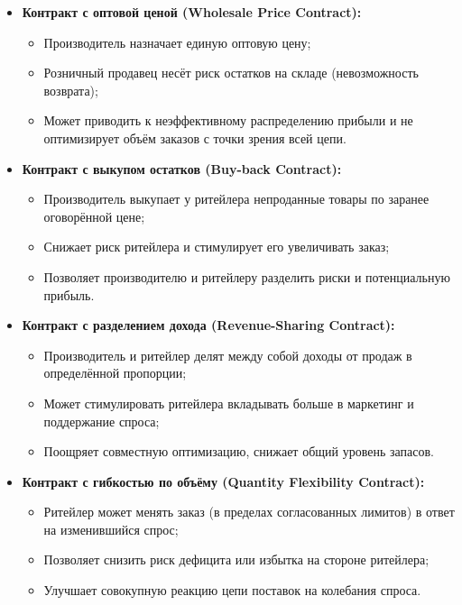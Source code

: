\begin{itemize}
    \item \textbf{Контракт с оптовой ценой (Wholesale Price Contract):}
    \begin{itemize}
        \item Производитель назначает единую оптовую цену;
        \item Розничный продавец несёт риск остатков на складе (невозможность возврата);
        \item Может приводить к неэффективному распределению прибыли и не оптимизирует объём заказов с точки зрения всей цепи.
    \end{itemize}
    \item \textbf{Контракт с выкупом остатков (Buy-back Contract):}
    \begin{itemize}
        \item Производитель выкупает у ритейлера непроданные товары по заранее оговорённой цене;
        \item Снижает риск ритейлера и стимулирует его увеличивать заказ;
        \item Позволяет производителю и ритейлеру разделить риски и потенциальную прибыль.
    \end{itemize}
    \item \textbf{Контракт с разделением дохода (Revenue-Sharing Contract):}
    \begin{itemize}
        \item Производитель и ритейлер делят между собой доходы от продаж в определённой пропорции;
        \item Может стимулировать ритейлера вкладывать больше в маркетинг и поддержание спроса;
        \item Поощряет совместную оптимизацию, снижает общий уровень запасов.
    \end{itemize}
    \item \textbf{Контракт с гибкостью по объёму (Quantity Flexibility Contract):}
    \begin{itemize}
        \item Ритейлер может менять заказ (в пределах согласованных лимитов) в ответ на изменившийся спрос;
        \item Позволяет снизить риск дефицита или избытка на стороне ритейлера;
        \item Улучшает совокупную реакцию цепи поставок на колебания спроса.
    \end{itemize}
\end{itemize}

